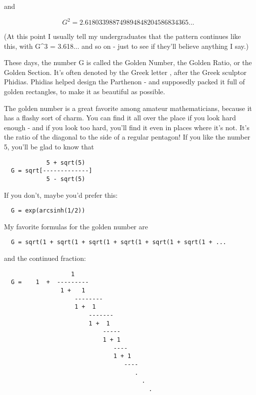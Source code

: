 and

$$
                G^{2  } = 2.618033988749894848204586834365...
$$
    
(At this point I usually tell my undergraduates that the pattern
continues like this, with G^{3} = 3.618... and so on - just to see if
they'll believe anything I say.)
 
These days, the number G is called the Golden Number, the Golden Ratio,  
or the Golden Section.  It's often denoted by the Greek letter \Phi , 
after the Greek sculptor Phidias.  Phidias helped design the Parthenon - 
and supposedly packed it full of golden rectangles, to make it as 
beautiful as possible.  

The golden number is a great favorite among amateur mathematicians, because 
it has a flashy sort of charm.  You can find it all over the place if you
look hard enough - and if you look too hard, you'll find it even in places
where it's not.   It's the ratio of the diagonal to the side of a regular 
pentagon!  If you like the number 5, you'll be glad to know that

\begin{verbatim}
            5 + sqrt(5)
  G = sqrt[-------------]
            5 - sqrt(5)
\end{verbatim}
    
If you don't, maybe you'd prefer this:

\begin{verbatim}
  G = exp(arcsinh(1/2))
\end{verbatim}
    
My favorite formulas for the golden number are

\begin{verbatim}
  G = sqrt(1 + sqrt(1 + sqrt(1 + sqrt(1 + sqrt(1 + sqrt(1 + ...
\end{verbatim}
    
and the continued fraction:

\begin{verbatim}
                   1
  G =    1  +  ---------
                1 +   1
                    -------- 
                    1 +  1
                        -------
                        1 +  1
                            -----
                            1 + 1
                               ----  
                               1 + 1
                                  ----
                                     .
                                       .
                                         .

\end{verbatim}
    

